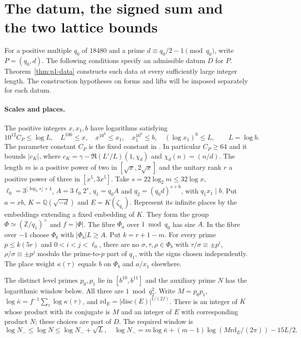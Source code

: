 \section{The datum, the signed sum and the two lattice bounds}\label{sz:setup}
For a positive multiple $q_0$ of $18480$ and a prime $d\equiv q_0/2-1\pmod{q_0}$,
write $P=(q_0,d)$. The following conditions specify an admissible datum
$D$ for $P$. Theorem~\ref{thm:p1-data} constructs such data at every
sufficiently large integer length. The construction hypotheses on forms
and lifts will be imposed separately for each datum.

\paragraph{Scales and places.}
The positive integers $x,x_1,b$ have logarithms satisfying
\[
 10^{12}C_P\le\log L,\quad L^{100}\le x,\quad x^{10^6}\le x_1,
 \quad x_1^{10^6}\le b,\quad (\log x_1)^6\le L,\qquad L=\log b .
\]
The parameter constant $C_P$ is the fixed constant in
.
In particular $C_P\ge64$ and it bounds
$|c_K|$, where $c_K=\gamma-\Re(L'/L)(1,\chi_d)$ and $\chi_d(n)=(n/d)$.
The length $m$ is a positive power of two in $[\sqrt x,2\sqrt x]$ and the
unitary rank $r$ a positive power of three in $[x^5,3x^5]$.
Take $s=22\log_2 m\le32\log x$,
$\ell_0=3^{\lfloor\log_3s\rfloor+4}$,
$A=3\ell_0 2^s$, $q_1=q_0A$ and $q_2=(q_0d)^{s+6}$, with $q_1x_1\mid b$.
Put $a=xb$, $K=\mathbb Q(\sqrt{-d})$ and $E=K(\zeta_{q_1})$.
Represent its infinite places by the embeddings extending a fixed embedding of
$K$. They form the group $\Phi\simeq(\mathbb Z/q_1)^\times$ and $f=|\Phi|$.
The fibre $\Phi_a$ over $1\bmod q_0$ has size $A$. In the fibre over
$-1$ choose $\Phi_b$ with $|\Phi_b|L\ge A$. Put $k=r+1-m$.
For every prime $p\le k(5r)$ and $0<i<j<\ell_0$, there are no
$\sigma,\tau,\rho\in\Phi_b$ with
$\tau/\sigma\equiv\pm p^i$, $\rho/\sigma\equiv\pm p^j$
modulo the prime-to-$p$ part of $q_1$, with the signs chosen independently.
The place weight $\kappa(\tau)$ equals $b$ on $\Phi_b$ and $a/x_1$ elsewhere.

The distinct level primes $p_0,p_1$ lie in $[b^{10},b^{11}]$ and the
auxiliary prime $N$ has the logarithmic window below. All three are
$1\bmod q_2^2$. Write $M=p_0p_1$, $\log\bar\kappa=f^{-1}\sum_\tau\log\kappa(\tau)$,
and $\mathrm{rd}_E=|\mathrm{disc}(E)|^{1/(2f)}$. There is an integer of $K$
whose product with its conjugate is $M$ and an integer of $E$ with corresponding
product $N$; these choices are part of $D$. The required window is
\[
 \log N_-\le\log N\le\log N_-+\sqrt L,\quad
 \log N_-=m\log\bar\kappa+(m-1)\log(M\mathrm{rd}_E/(2\pi))-15L/2 .
\]

